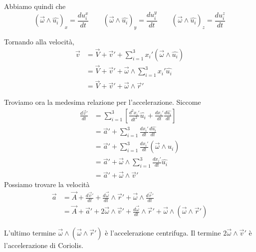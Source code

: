 \documentclass[a4paper]{article}
\begin{document}
Abbiamo quindi che
\[
    (\vec{\omega} \wedge \hat{u_i})_x = \frac{du_i^x}{dt}
    \qquad
    (\vec{\omega} \wedge \hat{u_i})_y = \frac{du_i^y}{dt}
    \qquad
    (\vec{\omega} \wedge \hat{u_i})_z = \frac{du_i^z}{dt}
\]

Tornando alla velocità,
\begin{align*}
    \vec{v} &= \vec{V} + \vec{v}' + \sum_{i=1}^3 x_i' (\vec{\omega} \wedge \hat{u_i}) \\
    &= \vec{V} + \vec{v}' + \vec{\omega} \wedge \sum_{i=1}^3 x_i' \hat{u_i} \\
    &= \vec{V} + \vec{v}' + \vec{\omega} \wedge \vec{r}'
\end{align*}

Troviamo ora la medesima relazione per l'accelerazione.
Siccome
\begin{align*}
    \frac{d\vec{v}'}{dt} &= \sum_{i=1}^3 \left[
        \frac{d^2 x_i'}{dt^2} \hat{u_i} + \frac{dx_i'}{dt} \frac{d\hat{u_i}}{dt}
    \right] \\
    &= \vec{a}' + \sum_{i=1}^3 \frac{dx_i'}{dt} \frac{d\hat{u_i}}{dt} \\
    &= \vec{a}' + \sum_{i=1}^3 \frac{dx_i'}{dt} (\vec{\omega} \wedge \hat{u_i}) \\
    &= \vec{a}' + \vec{\omega} \wedge \sum_{i=1}^3 \frac{dx_i'}{dt} \hat{u_i} \\
    &= \vec{a}' + \vec{\omega} \wedge \vec{v}'
\end{align*}
Possiamo trovare la velocità
\begin{align*}
    \vec{a} &= \vec{A} + \frac{d\vec{v}'}{dt} + \frac{d\vec{\omega}}{dt} \wedge \vec{r}'
    + \vec{\omega} \wedge \frac{d\vec{r}'}{dt} \\
    &= \vec{A} + \vec{a}' + 2 \vec{\omega} \wedge \vec{v}' + \frac{d\vec{\omega}}{dt} \wedge \vec{r}'
    + \vec{\omega} \wedge (\vec{\omega} \wedge \vec{r}')
\end{align*}

L'ultimo termine \(\vec{\omega} \wedge (\vec{\omega} \wedge \vec{r}')\) è l'accelerazione centrifuga.
Il termine \(2 \vec{\omega} \wedge \vec{v}'\) è l'accelerazione di Coriolis.
\end{document}
